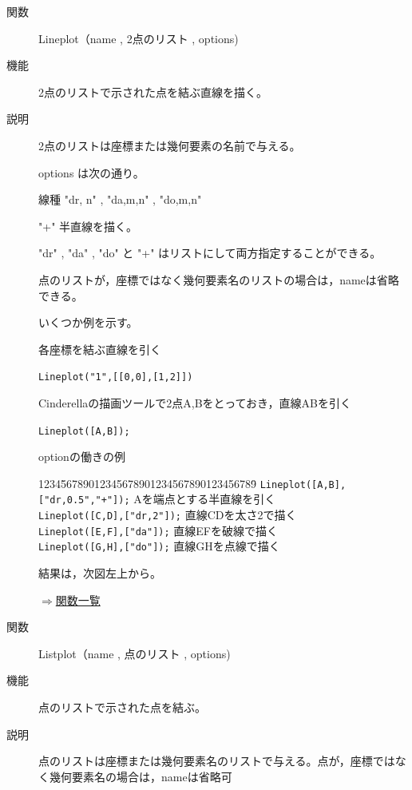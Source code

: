 \documentclass[papersize,a4paper,12pt,uplatex]{jsarticle}
\begin{document}
\begin{description}
\vspace{70mm}

\vspace{\baselineskip}
\hypertarget{lineplot}{}
\item[関数]  Lineplot（name , 2点のリスト , options)
\item[機能]  2点のリストで示された点を結ぶ直線を描く。
\item[説明]  2点のリストは座標または幾何要素の名前で与える。

options は次の通り。

線種      "dr, n"  , "da,m,n" , "do,m,n"

 "+"        半直線を描く。

"dr" , "da" , "do" と "+" はリストにして両方指定することができる。

点のリストが，座標ではなく幾何要素名のリストの場合は，nameは省略できる。

いくつか例を示す。

\vspace{\baselineskip}
各座標を結ぶ直線を引く

\hspace{5mm} \verb|Lineplot("1",[[0,0],[1,2]])|

Cinderellaの描画ツールで2点A,Bをとっておき，直線ABを引く

\hspace{5mm} \verb|Lineplot([A,B]);| 

optionの働きの例
\begin{tabbing}
1234\=56789012345678901234567890123456789\=\kill
 \> \verb|Lineplot([A,B],["dr,0.5","+"]);|    \>Aを端点とする半直線を引く\\
 \> \verb|Lineplot([C,D],["dr,2"]);|        \>直線CDを太さ2で描く\\
 \> \verb|Lineplot([E,F],["da"]);|         \>直線EFを破線で描く\\
 \> \verb|Lineplot([G,H],["do"]);|        \>直線GHを点線で描く
\end{tabbing}
結果は，次図左上から。

\vspace{\baselineskip}
\hspace{20mm} 

\begin{flushright}  \hyperlink{functionlist}{$\Rightarrow$関数一覧}\end{flushright}

\vspace{\baselineskip}
\hypertarget{listplot}{}
\item[関数]  Listplot（name , 点のリスト , options)
\item[機能]  点のリストで示された点を結ぶ。
\item[説明]  点のリストは座標または幾何要素名のリストで与える。点が，座標ではなく幾何要素名の場合は，nameは省略可 


\end{description}
\end{document}

